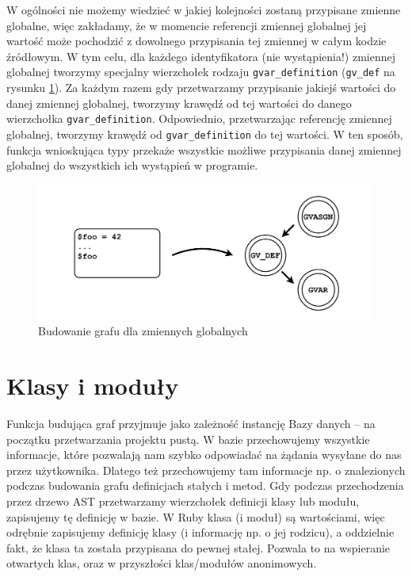 \documentclass[shortabstract,mgr]{iithesis}
\begin{document}
W ogólności nie możemy wiedzieć w jakiej kolejności zostaną przypisane zmienne globalne, więc zakładamy, że w momencie referencji zmiennej globalnej jej wartość może pochodzić z dowolnego przypisania tej zmiennej w całym kodzie źródłowym. W tym celu, dla każdego identyfikatora (nie wystąpienia!) zmiennej globalnej tworzymy specjalny wierzchołek rodzaju \texttt{gvar\_definition} (\texttt{gv\_def} na rysunku \ref{fig:graph-gvars}). Za każdym razem gdy przetwarzamy przypisanie jakiejś wartości do danej zmiennej globalnej, tworzymy krawędź od tej wartości do danego wierzchołka \texttt{gvar\_definition}. Odpowiednio, przetwarzając referencję zmiennej globalnej, tworzymy krawędź od \texttt{gvar\_definition} do tej wartości. W ten sposób, funkcja wnioskująca typy przekaże wszystkie możliwe przypisania danej zmiennej globalnej do wszystkich ich wystąpień w programie.

\begin{figure}[htb]
	\centering
	\includegraphics[scale=0.4]{imgs/msc-gvars.png}
	\caption{Budowanie grafu dla zmiennych globalnych}
	\label{fig:graph-gvars}
\end{figure}

\section{Klasy i moduły}

Funkcja budująca graf przyjmuje jako zależność instancję Bazy danych -- na początku przetwarzania projektu pustą. W bazie przechowujemy wszystkie informacje, które pozwalają nam szybko odpowiadać na żądania wysyłane do nas przez użytkownika. Dlatego też przechowujemy tam informacje np. o znalezionych podczas budowania grafu definicjach stałych i metod.
Gdy podczas przechodzenia przez drzewo AST przetwarzamy wierzchołek definicji klasy lub modułu, zapisujemy tę definicję w bazie. W Ruby klasa (i moduł) są wartościami, więc odrębnie zapisujemy definicję klasy (i informację np. o jej rodzicu), a oddzielnie fakt, że klasa ta została przypisana do pewnej stałej. Pozwala to na wspieranie otwartych klas, oraz w przyszłości klas/modułów anonimowych.
\end{document}
